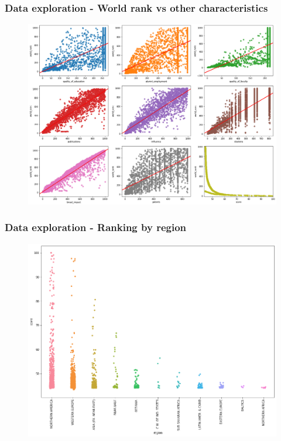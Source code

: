 \documentclass[mathserif,notheorems,11pt]{beamer}
\begin{document}
\begin{frame}
\frametitle{Data exploration - World rank vs  other characteristics}
\begin{figure}
	\centering
	\includegraphics[width=0.9\linewidth]{graphs/rank_scatterplot}
\end{figure}

\end{frame}

\begin{frame}
\frametitle{Data exploration - Ranking by region}
\begin{figure}
	\centering
	\includegraphics[width=0.9\linewidth]{graphs/region_stripplot}

\end{figure}
\end{frame}
\end{document}

